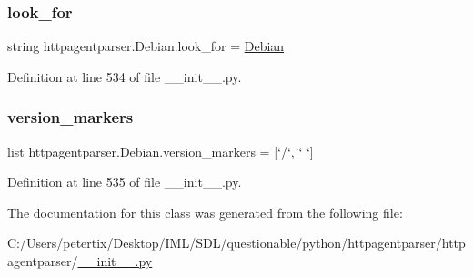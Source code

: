 \subsubsection{\texorpdfstring{look\+\_\+for}{look\_for}}
{\footnotesize\ttfamily string httpagentparser.\+Debian.\+look\+\_\+for = \textquotesingle{}\hyperlink{classhttpagentparser_1_1_debian}{Debian}\textquotesingle{}\hspace{0.3cm}{\ttfamily [static]}}



Definition at line 534 of file \+\_\+\+\_\+init\+\_\+\+\_\+.\+py.

\hypertarget{classhttpagentparser_1_1_debian_a522cfd32af8b7c5f1f9cf7c09dc7b54c}{}\label{classhttpagentparser_1_1_debian_a522cfd32af8b7c5f1f9cf7c09dc7b54c} 
\subsubsection{\texorpdfstring{version\+\_\+markers}{version\_markers}}
{\footnotesize\ttfamily list httpagentparser.\+Debian.\+version\+\_\+markers = \mbox{[}\char`\"{}/\char`\"{}, \char`\"{} \char`\"{}\mbox{]}\hspace{0.3cm}{\ttfamily [static]}}



Definition at line 535 of file \+\_\+\+\_\+init\+\_\+\+\_\+.\+py.



The documentation for this class was generated from the following file\+:\begin{DoxyCompactItemize}
\item 
C\+:/\+Users/petertix/\+Desktop/\+I\+M\+L/\+S\+D\+L/questionable/python/httpagentparser/httpagentparser/\hyperlink{____init_____8py}{\+\_\+\+\_\+init\+\_\+\+\_\+.\+py}\end{DoxyCompactItemize}

